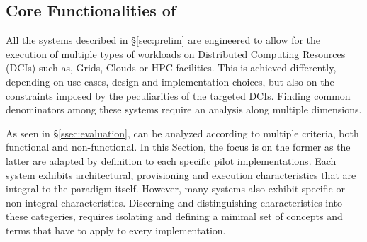\documentclass{sig-alternate}
\begin{document}

\subsection{Core Functionalities of \pilotjobs}
\label{subsec:vocab_core_functionalities}

All the \pilotjob systems described in \S\ref{sec:prelim} are
engineered to allow for the execution of multiple types of workloads
on Distributed Computing Resources (DCIs) such as, Grids, Clouds or
HPC facilities. This is achieved differently, depending on use cases,
design and implementation choices, but also on the constraints imposed
by the peculiarities of the targeted DCIs.  Finding common
denominators among these systems require an analysis along multiple
dimensions.

As seen in \S\ref{ssec:evaluation}, \pilotjobs can be analyzed
according to multiple criteria, both functional and non-functional. In
this Section, the focus is on the former as the latter are adapted by
definition to each specific pilot implementations.  Each \pilotjob
system exhibits architectural, provisioning and execution
characteristics that are integral to the \pilotjob paradigm itself.
However, many \pilotjob systems also exhibit specific or non-integral
characteristics. Discerning and distinguishing characteristics into
these categeries, requires isolating and defining a minimal set of
concepts and terms that have to apply to every \pilotjob
implementation.


\end{document}
